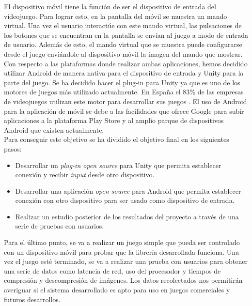 El dispositivo m\'ovil tiene la funci\'on de ser el dispositivo de entrada del videojuego. Para lograr esto, en la pantalla del m\'ovil se muestra un mando virtual. Una vez el usuario interact\'ue con este mando virtual, las pulsaciones de los botones que se encuentran en la pantalla se env\'ian al juego a modo de entrada de usuario. Adem\'as de esto, el mando virtual que se muestra puede configurarse desde el juego envi\'andole al dispositivo m\'ovil la imagen del mando que mostrar.\\

Con respecto a las plataformas donde realizar ambas aplicaciones, hemos decidido utilizar Android de manera nativa para el dispositivo de entrada y Unity para la parte del juego. Se ha decidido hacer el plug-in para Unity ya que es uno de los motores de juegos m\'as utilizado actualmente. En Espa\~na el 83\% de las empresas de videojuegos utilizan este motor para desarrollar sus juegos . El uso de Android para la aplicaci\'on de m\'ovil se debe a las facilidades que ofrece Google para subir aplicaciones a la plataforma Play Store y al amplio parque de dispositivos Android que existen actualmente.\\

Para conseguir este objetivo se ha dividido el objetivo final en los siguientes pasos:

\begin {itemize}
\item Desarrollar un \textit{plug-in open source} para Unity que permita establecer conexi\'on y recibir \textit{input} desde otro dispositivo.
\item Desarrollar una aplicaci\'on \textit{open source} para Android que permita establecer conexi\'on con otro dispositivo para ser usado como dispositivo de entrada.
\item Realizar un estudio posterior de los resultados del proyecto a trav\'es de una serie de pruebas con usuarios. 
\end {itemize}

Para el \'ultimo punto, se va a realizar un juego simple que pueda ser controlado con un dispositivo m\'ovil para probar que la librer\'ia desarrollada funciona. Una vez el juego est\'e terminado, se va a realizar una prueba con usuarios para obtener una serie de datos como latencia de red, uso del procesador y tiempos de compresi\'on y descompresi\'on de im\'agenes. Los datos recolectados nos permitir\'an averiguar si el sistema desarrollado es apto para uso en juegos comerciales y futuros desarrollos.

